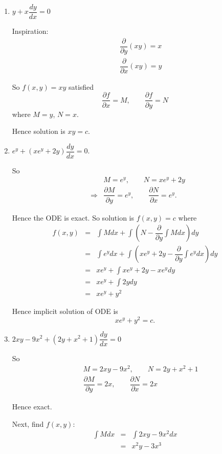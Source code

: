 \begin{examples}\quad
 \begin{enumerate}
  \item $y+x \dfrac{dy}{dx} = 0$
  
  Inspiration:
  \begin{eqnarray*}
   && \dfrac{\partial}{\partial y} (xy) = x\\
   && \dfrac{\partial}{\partial x} (xy) = y
  \end{eqnarray*}
  
  So $f(x,y)=xy$ satisfied 
  \[
  \dfrac{\partial f}{\partial x}=M, \qquad \dfrac{\partial f}{\partial y}=N
  \]
where $M=y$, $N=x$.
  
  Hence solution is $xy=c$.
  
  \item $e^{y} + (xe^{y} + 2y) \dfrac{dy}{dx}=0$.
  
  So
  \begin{eqnarray*}
&&   M=e^{y}, \qquad N=xe^{y} + 2y\\
&\Rightarrow& \dfrac{\partial M}{\partial y} = e^{y}, \qquad \dfrac{\partial N}{\partial x}=e^{y}.
  \end{eqnarray*}

  Hence the ODE is exact. So solution is $f(x,y)=c$ where
  \begin{eqnarray*}
   f(x,y) &=& \int M dx + \int \left(N - \dfrac{\partial}{\partial y} \int Mdx\right)dy\\
   &=& \int e^{y}dx + \int \left(xe^{y} + 2y - \dfrac{\partial}{\partial y} \int e^{y} dx\right) dy\\
   &=& x e^{y} + \int xe^{y} + 2y - xe^{y} dy\\
   &=& xe^{y} + \int 2y dy\\
   &=& xe^{y} + y^{2}
  \end{eqnarray*}

  Hence implicit solution of ODE is
  \[
   xe^{y} + y^{2} = c.
  \]

  
  \item $2xy - 9x^2 + (2y+x^2+1)\dfrac{dy}{dx} = 0$
  
  So
  \begin{eqnarray*}
&&   M=2xy-9x^2, \qquad N=2y+x^2+1\\
&&   \dfrac{\partial M}{\partial y} = 2x, \qquad \dfrac{\partial N}{\partial x}=2x
  \end{eqnarray*}

  Hence exact.

  Next, find $f(x,y)$:
  \begin{eqnarray*}
   \int M dx &=& \int 2xy - 9x^2 dx\\
   &=& x^2 y - 3 x^3
  \end{eqnarray*}


\end{enumerate}
\end{examples}
